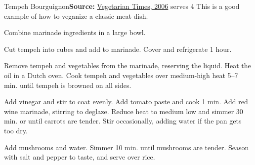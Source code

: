 \begin{recipe}{Tempeh Bourguignon}{}{\textbf{Source:} \href{https://www.vegetariantimes.com/recipes/tempeh-bourgignon/}{Vegetarian Times, 2006} \hfill serves 4}
  \freeform This is a good example of how to veganize a classic meat dish.

Combine marinade ingredients in a large bowl.

Cut tempeh into cubes and add to marinade. Cover and refrigerate 1 hour.

Remove tempeh and vegetables from the marinade, reserving the liquid. Heat the oil in a Dutch oven. Cook tempeh and vegetables over medium-high heat 5--7 min. until tempeh is browned on all sides.

Add vinegar and stir to coat evenly. Add tomato paste and cook 1 min. Add red wine marinade, stirring to deglaze. Reduce heat to medium low and simmer 30 min. or until carrots are tender. Stir occasionally, adding water if the pan gets too dry.

Add mushrooms and water. Simmer 10 min. until mushrooms are tender. Season with salt and pepper to taste, and serve over rice.
\end{recipe}